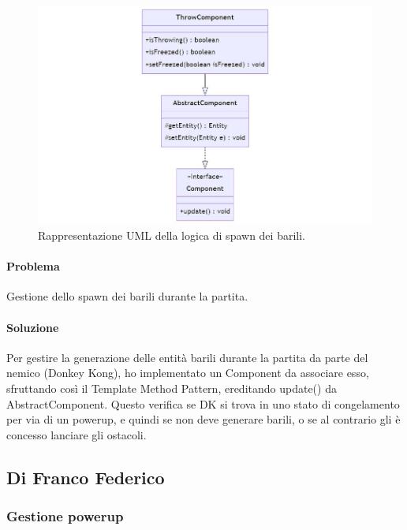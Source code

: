 \documentclass[a4paper,12pt]{report}
\begin{document}
\begin{figure}[H]
\centering{}
\includegraphics[width=\textwidth]{img/throw.jpg}
\caption{Rappresentazione UML della logica di spawn dei barili.}
\end{figure}

\paragraph{Problema} Gestione dello spawn dei barili durante la partita.

\paragraph{Soluzione} Per gestire la generazione delle entità barili durante la partita da parte del nemico (Donkey Kong), ho implementato un Component da associare esso, sfruttando così il Template Method Pattern, ereditando update() da AbstractComponent. Questo verifica se DK si trova in uno stato di congelamento per via di un powerup, e quindi se non deve generare barili, o se al contrario gli è concesso lanciare gli ostacoli.

\subsection{Di Franco Federico}

\subsubsection{Gestione powerup}
\end{document}
